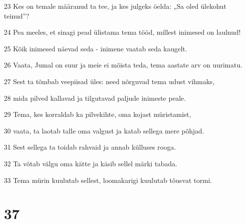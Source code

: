 \par 23 Kes on temale määranud ta tee, ja kes julgeks öelda: „Sa oled ülekohut teinud”?
\par 24 Pea meeles, et sinagi pead ülistama tema tööd, millest inimesed on laulnud!
\par 25 Kõik inimesed näevad seda - inimene vaatab seda kaugelt.
\par 26 Vaata, Jumal on suur ja meie ei mõista teda, tema aastate arv on uurimatu.
\par 27 Sest ta tõmbab veepiisad üles: need nõrguvad tema udust vihmaks,
\par 28 mida pilved kallavad ja tilgutavad paljude inimeste peale.
\par 29 Tema, kes korraldab ka pilvekihte, oma kojast müristamist,
\par 30 vaata, ta laotab talle oma valgust ja katab sellega mere põhjad.
\par 31 Sest sellega ta toidab rahvaid ja annab külluses rooga.
\par 32 Ta võtab välgu oma kätte ja käsib sellel märki tabada.
\par 33 Tema mürin kuulutab sellest, loomakarigi kuulutab tõusvat tormi.

\chapter{37}

